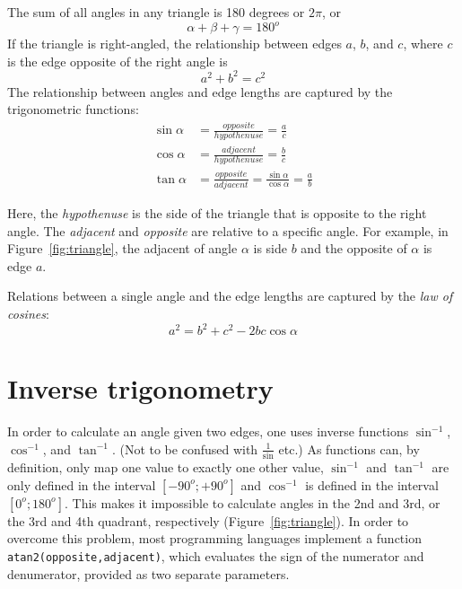 \documentclass[paper=6.14in:9.21in,pagesize=pdftex,11pt,twoside,openright]{scrbook}
\begin{document}
The sum of all angles in any triangle is 180 degrees or $2\pi$, or
\begin{equation}
\alpha + \beta + \gamma = 180^o
\end{equation}
If the triangle is right-angled, the relationship between edges $a$, $b$, and $c$, where $c$ is the edge opposite of the right angle is
\begin{equation}
a^2+b^2=c^2
\end{equation}
The relationship between angles and edge lengths are captured by the trigonometric functions:
\begin{eqnarray}
\sin{\alpha}&=\frac{opposite}{hypothenuse}=\frac{a}{c}\\
\cos{\alpha}&=\frac{adjacent}{hypothenuse}=\frac{b}{c}\\
\tan{\alpha}&=\frac{opposite}{adjacent}=\frac{\sin{\alpha}}{\cos{\alpha}}=\frac{a}{b}
\end{eqnarray}

Here, the \emph{hypothenuse} is the side of the triangle that is opposite to the right angle. The \emph{adjacent} and \emph{opposite} are relative to a specific angle. For example, in Figure~\ref{fig:triangle}, the adjacent of angle $\alpha$ is side $b$ and the opposite of $\alpha$ is edge $a$.

Relations between a single angle and the edge lengths are captured by the \emph{law of cosines}:
\begin{equation}
a^2=b^2+c^2-2bc\cos{\alpha}
\end{equation}

\section{Inverse trigonometry}
In order to calculate an angle given two edges, one uses inverse functions $\sin^{-1}$, $\cos^{-1}$, and $\tan^{-1}$. (Not to be confused with $\frac{1}{\sin}$ etc.) As functions can, by definition, only map one value to exactly one other value, $\sin^{-1}$ and $\tan^{-1}$ are only defined in the interval $[-90^o;+90^o]$ and $\cos^{-1}$ is defined in the interval $[0^o;180^o]$. This makes it impossible to calculate angles in the 2nd and 3rd, or the 3rd and 4th quadrant, respectively (Figure~\ref{fig:triangle}).
In order to overcome this problem, most programming languages implement a function \texttt{atan2(opposite,adjacent)}, which evaluates the sign of the numerator and denumerator, provided as two separate parameters.
\end{document}
